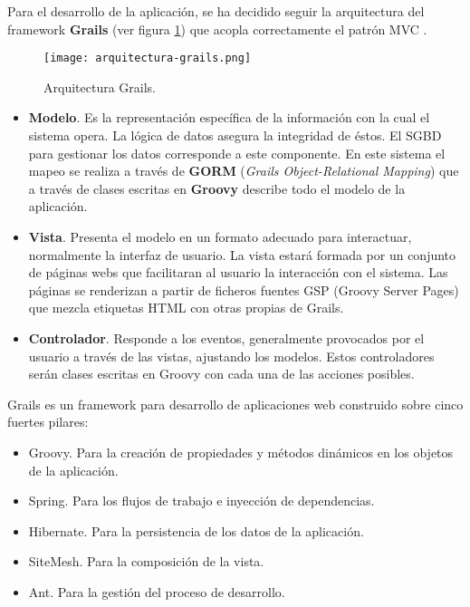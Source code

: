 Para el desarrollo de la aplicación, se ha decidido seguir la arquitectura del framework \textbf{Grails} (ver figura \ref{fig:arquitectura-grails}) que acopla correctamente el patrón MVC \cite{brito2009}.

\begin{figure}[!hpt]
	\begin{center} 
		\texttt{[image: arquitectura-grails.png]}
		\caption{Arquitectura Grails.}
		\label{fig:arquitectura-grails}
	\end{center}
\end{figure}

\begin{itemize}
	\item \textbf{Modelo}. Es la representación específica de la información con la cual el sistema opera. La lógica de datos asegura la integridad de éstos. El SGBD para gestionar los datos corresponde a este componente. En este sistema el mapeo se realiza a través de \textbf{GORM} (\textit{Grails Object-Relational Mapping}) que a través de clases escritas en \textbf{Groovy} describe todo el modelo de la aplicación.
	\item \textbf{Vista}. Presenta el modelo en un formato adecuado para interactuar, normalmente la interfaz de usuario. La vista estará formada por un conjunto de páginas webs que facilitaran al usuario la interacción con el sistema. Las páginas se renderizan a partir de ficheros fuentes GSP (Groovy Server Pages) que mezcla etiquetas HTML con otras propias de Grails.
	\item \textbf{Controlador}. Responde a los eventos, generalmente provocados por el usuario a través de las vistas, ajustando los modelos. Estos controladores serán clases escritas en Groovy con cada una de las acciones posibles.
\end{itemize}

Grails es un framework para desarrollo de aplicaciones web construido sobre cinco fuertes pilares:

\begin{itemize}
	\item Groovy. Para la creación de propiedades y métodos dinámicos en los objetos de la aplicación.
	\item Spring. Para los flujos de trabajo e inyección de dependencias.
	\item Hibernate. Para la persistencia de los datos de la aplicación.
	\item SiteMesh. Para la composición de la vista.
	\item Ant. Para la gestión del proceso de desarrollo.
\end{itemize}

